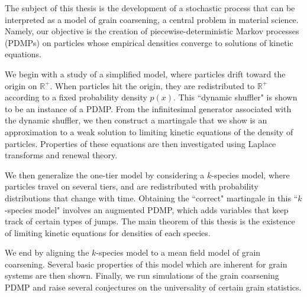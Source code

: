 The subject of this thesis is the development of a stochastic process that can be interpreted as a model of grain coarsening, a central problem in material science. Namely, our objective is the creation of piecewise-deterministic Markov processes (PDMPs) on particles whose empirical densities converge to solutions of kinetic equations.

We begin with a study of a simplified model, where particles drift toward the origin on $\mathbb{R}^+$.  When particles hit the origin, they are redistributed to $\mathbb{R}^+$ according to a fixed probability density $p(x)$.  This ``dynamic shuffler" is shown to be an instance of a PDMP.  From the infinitesimal generator associated with the dynamic shuffler, we then construct a martingale  that we show is an approximation to a weak solution to limiting kinetic equations of the density of particles.  Properties of these equations are then investigated using Laplace transforms and renewal theory.

We then generalize the one-tier model by considering a $k$-species model, where particles travel on several tiers, and are redistributed with probability distributions that change with time.  Obtaining the ``correct" martingale in this ``$k$-species model" involves an augmented PDMP, which adds variables that keep track of certain types of jumps.  The main theorem of this thesis is the existence of limiting kinetic equations for densities of each species.

We end by aligning the $k$-species model to a mean field model of grain coarsening.  Several basic properties of this model which are inherent for grain systems are then shown.  Finally, we run simulations of the grain coarsening PDMP and raise several conjectures on the universality of certain grain statistics.  

 
